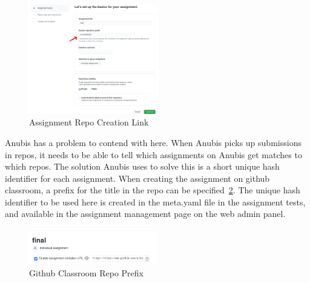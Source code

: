 \begin{figure}
    \centering
    \includegraphics[width=0.5\textwidth]{figures/github-classroom-1.png}
    \caption{Assignment Repo Creation Link\label{fig:github-classroom-1}}
\end{figure}

Anubis has a problem to contend with here.
When Anubis picks up submissions in repos, it needs to be able
to tell which assignments on Anubis get matches to which repos.
The solution Anubis uses to solve this is a short unique hash identifier 
for each assignment.
When creating the assignment on github classroom, a prefix for the title in the repo
can be specified~\ref{fig:github-classroom-2}.
The unique hash identifier to be used here is created in the meta.yaml file in the assignment
tests, and available in the assignment management page on the web admin panel.

\begin{figure}[ht]
    \centering
    \includegraphics[width=0.5\textwidth]{figures/github-classroom-2.png}
    \caption{Github Classroom Repo Prefix\label{fig:github-classroom-2}}
\end{figure}

